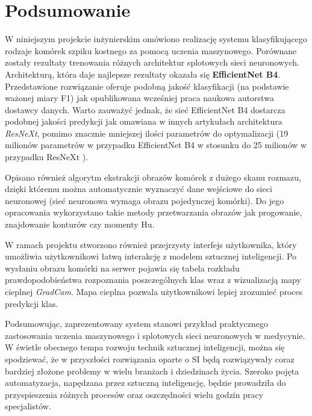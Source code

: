 \chapter{Podsumowanie}

W niniejszym projekcie inżynierskim omówiono realizację systemu klasyfikującego rodzaje komórek szpiku kostnego za pomocą uczenia maszynowego.
Porównane zostały rezultaty trenowania różnych architektur splotowych sieci neuronowych.
Architekturą, która daje najlepsze rezultaty okazała się \textbf{EfficientNet B4}.
Przedstawione rozwiązanie oferuje podobną jakość klasyfikacji (na podstawie ważonej miary F1) jak opublikowana wcześniej praca naukowa autorstwa dostawcy danych.
Warto zauważyć jednak, że sieć EfficientNet B4 dostarcza podobnej jakości predykcji jak omawiana w innych artykułach architektura \textit{ResNeXt}, pomimo znacznie mniejszej ilości parametrów do optymalizacji (19 milionów parametrów w przypadku EfficientNet B4 w stosunku do 25 milionów w przypadku ResNeXt \cite{resnext}).

Opisano również algorytm ekstrakcji obrazów komórek z dużego skanu rozmazu, dzięki któremu można automatycznie wyznaczyć dane wejściowe do sieci neuronowej (sieć neuronowa wymaga obrazu pojedynczej komórki).
Do jego opracowania wykorzystano takie metody przetwarzania obrazów jak progowanie, znajdowanie konturów czy momenty Hu.

W ramach projektu stworzono również przejrzysty interfejs użytkownika, który umożliwia użytkownikowi łatwą interakcję z modelem sztucznej inteligencji.
Po wysłaniu obrazu komórki na serwer pojawia się tabela rozkładu prawdopodobieństwa rozpoznania poszczególnych klas wraz z wizualizacją mapy cieplnej \textit{GradCam}.
Mapa cieplna pozwala użytkownikowi lepiej zrozumieć proces predykcji klas.

Podsumowując, zaprezentowany system stanowi przykład praktycznego zastosowania uczenia maszynowego i splotowych sieci neuronowych w medycynie.
W świetle obecnego tempa rozwoju technik sztucznej inteligencji, można się spodziewać, że w przyszłości rozwiązania oparte o SI będą rozwiązywały coraz bardziej złożone problemy w wielu branżach i dziedzinach życia.
Szeroko pojęta automatyzacja, napędzana przez sztuczną inteligencję, będzie prowadziła do przyspieszenia różnych procesów oraz oszczędności wielu godzin pracy specjalistów.